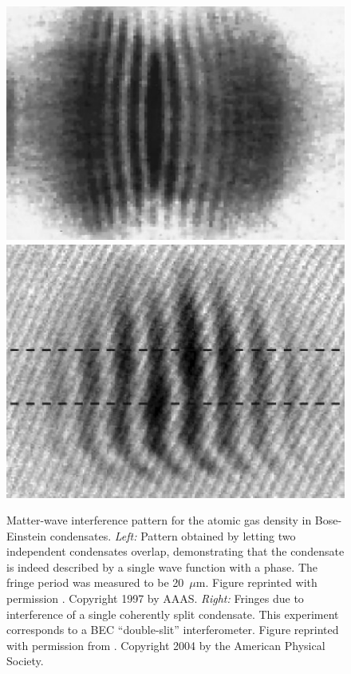\documentclass[12pt,aps,floatfix,amsmath,amssymb,showpacs,nofootinbib]{revtex4-2}
\begin{document}
\begin{figure}
\begin{center}
  \includegraphics[scale=.218]{bec-interference-n.eps}
  \includegraphics[scale=.2]{bec-doubleslit-n.eps}
\end{center}
\caption[Matter-wave interference pattern for the atomic gas
density in Bose-Einstein condensates]{\label{fig:bec1} Matter-wave
  interference pattern for the atomic gas density in Bose-Einstein
  condensates. {\it Left:} Pattern obtained by letting two independent
  condensates overlap, demonstrating that the condensate is indeed
  described by a single wave function with a phase. The fringe period
  was measured to be 20~$\mu$m. Figure reprinted with permission
  \cite{Andrews:1997:um}. Copyright 1997 by AAAS. {\it Right:}
  Fringes due to interference of a single coherently split condensate.
  This experiment corresponds to a BEC ``double-slit'' interferometer.
  Figure reprinted with permission from \cite{Shin:2004:lo}.
  Copyright 2004 by the American Physical Society.  }
\end{figure}
\end{document}
